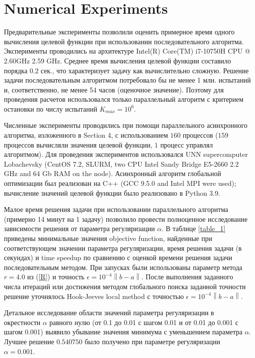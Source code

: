 \documentclass{svproc}
\begin{document}
\section{Numerical Experiments}\label{Sec_Exp}

Предварительные эксперименты позволили оценить примерное время одного вычисления целевой функции при использовании последовательного алгоритма. Эксперименты проводились на архитектуре Intel(R) Core(TM) i7-10750H CPU @ 2.60GHz 2.59 GHz. Среднее время вычисления целевой функции составило порядка $0.2$ сек., что характеризует задачу как вычислительно сложную. Решение задачи последовательным алгоритмом потребовало бы не менее 1 млн. испытаний и, соответственно, не менее 54 часов (оценочное значение).
Поэтому для проведения расчетов использовался только параллельный алгоритм с критерием остановки по числу испытаний $K_{max}=10^6$. 

Численные эксперименты проводились при помощи параллельного асинхронного алгоритма, изложенного в Section 4, с использованием $160$ процессов ($159$ процессов вычисляли значения целевой функции, $1$ процесс управлял алгоритмом). Для проведения экспериментов использовался UNN supercomputer Lobachevsky (CentOS 7.2, SLURM, two CPU Intel Sandy Bridge E5-2660 2.2 GHz and 64 Gb RAM on the node). Асинхронный алгоритм глобальной оптимизации был реализован на C++ (GCC 9.5.0 and Intel MPI were used); вычисление значений целевой функции было реализовано в Python 3.9.

Малое время решения задачи при использовании параллельного алгоритма (примерно 14 минут на 1 задачу) позволило провести полноценное исследование зависимости решения от параметра регуляризации $\alpha$. В таблице \ref{table_1} приведены минимальные значения objective function, найденные при соответствующем значении параметра регуляризации, время решения задачи (в секундах) и time speedup по сравнению с оценкой времени решения задачи последовательным методом. При запусках были использованы параметр метода $r=4.0$ из (\ref{R}) и точность $\epsilon = 10^{-4}\left\|b-a\right\|$. После выполнения заданного числа итераций или достижения методом глобального поиска заданной точности решение уточнялось Hook-Jeeves local method \cite{HookJeeves} с точностью $\epsilon = 10^{-4}\left\|b-a\right\|$.

Детальное исследование области значений параметра регуляризации в окрестности $\alpha$ равного нулю (от 0.1 до 0.01 с шагом 0.01 и от 0.01 до 0.001 с шагом 0.001) выявило убывание значения минимума с уменьшением параметра $\alpha$. Лучшее решение $0.540750$ было получено при параметре регуляризации $\alpha = 0.001$.
\end{document}
